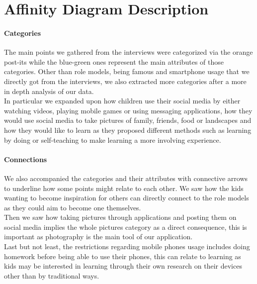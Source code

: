 \documentclass[12pt]{scrartcl}
\begin{document}
\section*{Affinity Diagram Description}

	\paragraph{Categories} The main points we gathered from the interviews were categorized via
the orange post-its while the blue-green ones represent the main attributes of those categories. 
Other than role models, being famous and smartphone usage that we directly got from the 
interviews, we also extracted more categories after a more in depth analysis of our data.\\
In particular we expanded upon how children use their social media by either watching videos, 
playing mobile games or using messaging applications, how they would use social media to take 
pictures of family, friends, food or landscapes and how they would like to learn as they proposed 
different methods such as learning by doing or self-teaching to make learning a more involving 
experience.

	\paragraph{Connections} We also accompanied the categories and their attributes with 
connective arrows to underline how some points might relate to each other. We saw how the kids
wanting to become inspiration for others can directly connect to the role models as they could
aim to become one themselves.\\
Then we saw how taking pictures through applications and posting them on social media implies
the whole pictures category as a direct consequence, this is important as photography is the main
tool of our application.\\
Last but not least, the restrictions regarding mobile phones usage includes doing homework
before being able to use their phones, this can relate to learning as kids may be interested in
learning through their own research on their devices other than by traditional ways.
\end{document}
